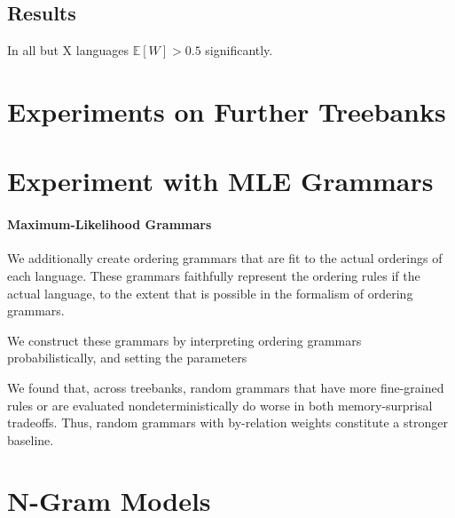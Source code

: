 \documentclass[11pt,letterpaper]{article}
\newcommand{\E}[0]{\mathbb{E}}
\begin{document}
%



%
%



\subsection{Results}




In all but X languages $\E[W] > 0.5$ significantly.



\section{Experiments on Further Treebanks}





\appendix

\section{Experiment with MLE Grammars}


\paragraph{Maximum-Likelihood Grammars}
We additionally create ordering grammars that are fit to the actual orderings of each language.
These grammars faithfully represent the ordering rules if the actual language, to the extent that is possible in the formalism of ordering grammars.

We construct these grammars by interpreting ordering grammars probabilistically, and setting the parameters 


We found that, across treebanks, random grammars that have more fine-grained rules or are evaluated nondeterministically do worse in both memory-surprisal tradeoffs.
Thus, random grammars with by-relation weights constitute a stronger baseline.



\section{N-Gram Models}
\end{document}
